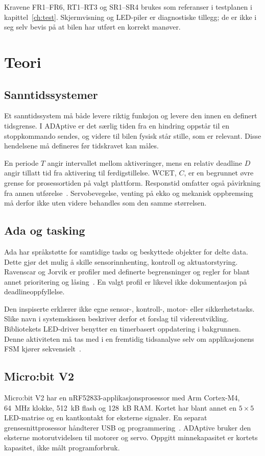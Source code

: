 \documentclass[a4paper,11pt,oneside]{report}
\newcommand{\kode}[1]{\begingroup
 \sbox0{\texttt{\detokenize{#1}}}%
 \ifdim\wd0>150pt\relax
  {\urlstyle{tt}\expandafter\nolinkurl\expandafter{\detokenize{#1}}}%
 \else\usebox0\fi\endgroup}
\begin{document}
Kravene FR1--FR6, RT1--RT3 og SR1--SR4 brukes som referanser i testplanen
i kapittel~\ref{ch:test}. Skjermvisning og LED-piler er diagnostiske tillegg;
de er ikke i seg selv bevis på at bilen har utført en korrekt manøver.

\chapter{Teori}\label{ch:teori}
\section{Sanntidssystemer}
Et sanntidssystem må både levere riktig funksjon og levere den innen en
definert tidsgrense. I ADAptive er det særlig tiden fra en hindring oppstår
til en stoppkommando sendes, og videre til bilen fysisk står stille, som er
relevant. Disse hendelsene må defineres før tidskravet kan måles.

En periode $T$ angir intervallet mellom aktiveringer, mens en relativ
deadline $D$ angir tillatt tid fra aktivering til ferdigstillelse.
WCET, $C$, er en begrunnet øvre grense for prosessortiden på valgt plattform.
Responstid omfatter også påvirkning fra annen utførelse~\cite{josephpandya}.
Servobevegelse, venting på ekko og mekanisk oppbremsing må derfor
ikke uten videre behandles som den samme størrelsen.

\section{Ada og tasking}
Ada har språkstøtte for samtidige tasks og beskyttede objekter for delte data.
Dette gjør det mulig å skille sensorinnhenting, kontroll og aktuatorstyring.
Ravenscar og Jorvik er profiler med definerte begrensninger og regler for
blant annet prioritering og låsing~\cite{adarm,adaprofiles}.
En valgt profil er likevel ikke dokumentasjon på deadlineoppfyllelse.

Den inspiserte \kode{main.adb} erklærer ikke egne sensor-, kontroll-, motor-
eller sikkerhetstasks. Slike navn i systemskissen beskriver derfor et forslag
til videreutvikling. Bibliotekets LED-driver benytter en timerbasert
oppdatering i bakgrunnen. Denne aktiviteten må tas med i en fremtidig
tidsanalyse selv om applikasjonens FSM kjører sekvensielt~\cite{adl}.

\section{Micro:bit V2}
Micro:bit V2 har en nRF52833-applikasjonsprosessor med Arm Cortex-M4,
64~MHz klokke, 512~kB flash og 128~kB RAM. Kortet har blant annet en
$5\times5$ LED-matrise og en kantkontakt for eksterne signaler.
En separat grensesnittprosessor håndterer USB og programmering~\cite{microbit}.
ADAptive bruker den eksterne motorutvidelsen til motorer og servo.
Oppgitt minnekapasitet er kortets kapasitet, ikke målt programforbruk.
\end{document}
